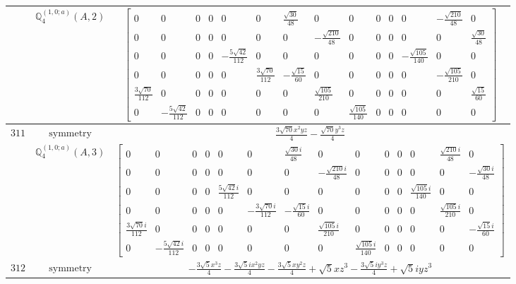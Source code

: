 \documentclass[fleqn,8pt,landscape]{jsarticle}
\begin{document}
\begin{longtable}{ccc}
$  $ & $ \mathbb{Q}_{4}^{(1,0;a)}(A,2) $ & $ \begin{bmatrix} 0 & 0 & 0 & 0 & 0 & 0 & \frac{\sqrt{30}}{48} & 0 & 0 & 0 & 0 & 0 & - \frac{\sqrt{210}}{48} & 0 \\ 0 & 0 & 0 & 0 & 0 & 0 & 0 & - \frac{\sqrt{210}}{48} & 0 & 0 & 0 & 0 & 0 & \frac{\sqrt{30}}{48} \\ 0 & 0 & 0 & 0 & - \frac{5 \sqrt{42}}{112} & 0 & 0 & 0 & 0 & 0 & 0 & - \frac{\sqrt{105}}{140} & 0 & 0 \\ 0 & 0 & 0 & 0 & 0 & \frac{3 \sqrt{70}}{112} & - \frac{\sqrt{15}}{60} & 0 & 0 & 0 & 0 & 0 & - \frac{\sqrt{105}}{210} & 0 \\ \frac{3 \sqrt{70}}{112} & 0 & 0 & 0 & 0 & 0 & 0 & \frac{\sqrt{105}}{210} & 0 & 0 & 0 & 0 & 0 & \frac{\sqrt{15}}{60} \\ 0 & - \frac{5 \sqrt{42}}{112} & 0 & 0 & 0 & 0 & 0 & 0 & \frac{\sqrt{105}}{140} & 0 & 0 & 0 & 0 & 0 \end{bmatrix} $ \\ \hline
$ 311 $ & $ \text{symmetry} $ & $ \frac{3 \sqrt{70} x^{2} y z}{4} - \frac{\sqrt{70} y^{3} z}{4} $ \\
$  $ & $ \mathbb{Q}_{4}^{(1,0;a)}(A,3) $ & $ \begin{bmatrix} 0 & 0 & 0 & 0 & 0 & 0 & \frac{\sqrt{30} i}{48} & 0 & 0 & 0 & 0 & 0 & \frac{\sqrt{210} i}{48} & 0 \\ 0 & 0 & 0 & 0 & 0 & 0 & 0 & - \frac{\sqrt{210} i}{48} & 0 & 0 & 0 & 0 & 0 & - \frac{\sqrt{30} i}{48} \\ 0 & 0 & 0 & 0 & \frac{5 \sqrt{42} i}{112} & 0 & 0 & 0 & 0 & 0 & 0 & \frac{\sqrt{105} i}{140} & 0 & 0 \\ 0 & 0 & 0 & 0 & 0 & - \frac{3 \sqrt{70} i}{112} & - \frac{\sqrt{15} i}{60} & 0 & 0 & 0 & 0 & 0 & \frac{\sqrt{105} i}{210} & 0 \\ \frac{3 \sqrt{70} i}{112} & 0 & 0 & 0 & 0 & 0 & 0 & \frac{\sqrt{105} i}{210} & 0 & 0 & 0 & 0 & 0 & - \frac{\sqrt{15} i}{60} \\ 0 & - \frac{5 \sqrt{42} i}{112} & 0 & 0 & 0 & 0 & 0 & 0 & \frac{\sqrt{105} i}{140} & 0 & 0 & 0 & 0 & 0 \end{bmatrix} $ \\ \hline
$ 312 $ & $ \text{symmetry} $ & $ - \frac{3 \sqrt{5} x^{3} z}{4} - \frac{3 \sqrt{5} i x^{2} y z}{4} - \frac{3 \sqrt{5} x y^{2} z}{4} + \sqrt{5} x z^{3} - \frac{3 \sqrt{5} i y^{3} z}{4} + \sqrt{5} i y z^{3} $ \\

\end{longtable}
\end{document}
